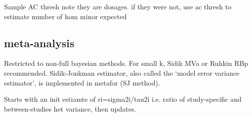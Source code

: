 
Sample AC thresh
    note they are dosages. if they were not, use ac thresh to estimate number of hom minor expected

\subsection{ meta-analysis}


Restricted to non-full bayesian methods.
For small k, Sidik MVa or Ruhkin RBp recommended.
Sidik-Jonkman estimator, also called the ‘model error variance estimator’, is implemented in metafor (SJ method).

Starts with an init estiamte of ri=sigma2i/tau2i i.e. ratio of study-specific and between-studies het variance, then updates.

